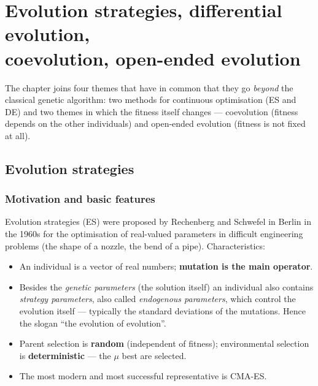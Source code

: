 \documentclass[11pt,a4paper]{article}
\theoremstyle{definition}
\providecommand{\uv}[1]{``#1''}
\begin{document}
\section[Evolution strategies, differential evolution, coevolution, open-ended evolution]%
{Evolution strategies, differential evolution,\protect\\
coevolution, open-ended evolution}
\label{sec:es}

The chapter joins four themes that have in common that they go \emph{beyond} the classical
genetic algorithm: two methods for continuous optimisation (ES and DE) and two themes in
which the fitness itself changes --- coevolution (fitness depends on the other individuals)
and open-ended evolution (fitness is not fixed at all).

\subsection{Evolution strategies}
\label{ssec:es}
\subsubsection{Motivation and basic features}

Evolution strategies (ES) were proposed by Rechenberg and Schwefel in Berlin in
the 1960s for the optimisation of real-valued parameters in difficult
engineering problems (the shape of a nozzle, the bend of a pipe).
Characteristics:

\begin{itemize}
\item An individual is a vector of real numbers; \textbf{mutation is the main
  operator}.
\item Besides the \emph{genetic parameters} (the solution itself) an individual
  also contains \emph{strategy parameters}, also called \emph{endogenous
  parameters}, which control the evolution itself --- typically the standard
  deviations of the mutations. Hence the slogan \uv{the evolution of
  evolution}.
\item Parent selection is \textbf{random} (independent of fitness);
  environmental selection is \textbf{deterministic} --- the $\mu$ best are
  selected.
\item The most modern and most successful representative is CMA-ES.
\end{itemize}
\end{document}
